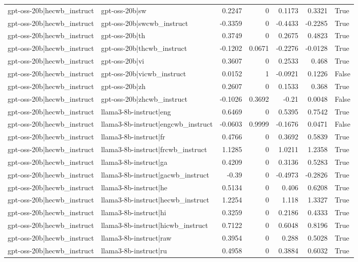 \begin{table}
\begin{tabular}{l l r r r r l}
gpt-oss-20b|hecwb_instruct & gpt-oss-20b|sw & 0.2247 & 0 & 0.1173 & 0.3321 & True \\
gpt-oss-20b|hecwb_instruct & gpt-oss-20b|swcwb_instruct & -0.3359 & 0 & -0.4433 & -0.2285 & True \\
gpt-oss-20b|hecwb_instruct & gpt-oss-20b|th & 0.3749 & 0 & 0.2675 & 0.4823 & True \\
gpt-oss-20b|hecwb_instruct & gpt-oss-20b|thcwb_instruct & -0.1202 & 0.0671 & -0.2276 & -0.0128 & True \\
gpt-oss-20b|hecwb_instruct & gpt-oss-20b|vi & 0.3607 & 0 & 0.2533 & 0.468 & True \\
gpt-oss-20b|hecwb_instruct & gpt-oss-20b|vicwb_instruct & 0.0152 & 1 & -0.0921 & 0.1226 & False \\
gpt-oss-20b|hecwb_instruct & gpt-oss-20b|zh & 0.2607 & 0 & 0.1533 & 0.368 & True \\
gpt-oss-20b|hecwb_instruct & gpt-oss-20b|zhcwb_instruct & -0.1026 & 0.3692 & -0.21 & 0.0048 & False \\
gpt-oss-20b|hecwb_instruct & llama3-8b-instruct|eng & 0.6469 & 0 & 0.5395 & 0.7542 & True \\
gpt-oss-20b|hecwb_instruct & llama3-8b-instruct|engcwb_instruct & -0.0603 & 0.9999 & -0.1676 & 0.0471 & False \\
gpt-oss-20b|hecwb_instruct & llama3-8b-instruct|fr & 0.4766 & 0 & 0.3692 & 0.5839 & True \\
gpt-oss-20b|hecwb_instruct & llama3-8b-instruct|frcwb_instruct & 1.1285 & 0 & 1.0211 & 1.2358 & True \\
gpt-oss-20b|hecwb_instruct & llama3-8b-instruct|ga & 0.4209 & 0 & 0.3136 & 0.5283 & True \\
gpt-oss-20b|hecwb_instruct & llama3-8b-instruct|gacwb_instruct & -0.39 & 0 & -0.4973 & -0.2826 & True \\
gpt-oss-20b|hecwb_instruct & llama3-8b-instruct|he & 0.5134 & 0 & 0.406 & 0.6208 & True \\
gpt-oss-20b|hecwb_instruct & llama3-8b-instruct|hecwb_instruct & 1.2254 & 0 & 1.118 & 1.3327 & True \\
gpt-oss-20b|hecwb_instruct & llama3-8b-instruct|hi & 0.3259 & 0 & 0.2186 & 0.4333 & True \\
gpt-oss-20b|hecwb_instruct & llama3-8b-instruct|hicwb_instruct & 0.7122 & 0 & 0.6048 & 0.8196 & True \\
gpt-oss-20b|hecwb_instruct & llama3-8b-instruct|raw & 0.3954 & 0 & 0.288 & 0.5028 & True \\
gpt-oss-20b|hecwb_instruct & llama3-8b-instruct|ru & 0.4958 & 0 & 0.3884 & 0.6032 & True \\

\end{tabular}
\end{table}
